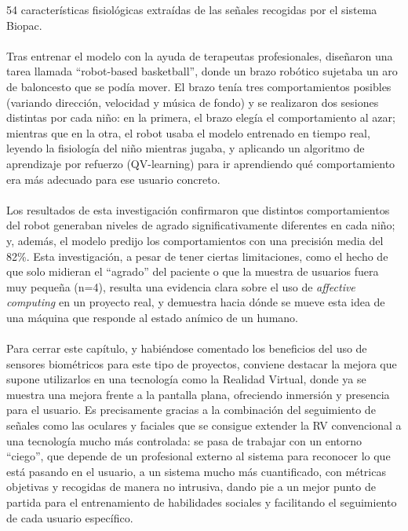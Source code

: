 \documentclass[12pt,twoside,titlepage]{report}
\begin{document}
54 características fisiológicas extraídas de las señales recogidas por el sistema Biopac.
\\\\
Tras entrenar el modelo con la ayuda de terapeutas profesionales, diseñaron una tarea llamada ``robot-based basketball'', donde un brazo robótico sujetaba un aro de baloncesto que se podía mover. El brazo tenía tres comportamientos posibles (variando dirección, velocidad y música de fondo) y se realizaron dos sesiones distintas por cada niño: en la primera, el brazo elegía el comportamiento al azar; mientras que en la otra, el robot usaba el modelo entrenado en tiempo real, leyendo la fisiología del niño mientras jugaba,
y aplicando un algoritmo de aprendizaje por refuerzo (QV-learning) para ir aprendiendo qué comportamiento era más adecuado para ese usuario concreto.
\\\\
Los resultados de esta investigación confirmaron que distintos comportamientos del robot generaban niveles de agrado significativamente diferentes en cada niño; y, además, el modelo predijo los comportamientos con una precisión media del 82\%. Esta investigación, a pesar de tener ciertas limitaciones, como el hecho de que solo midieran el ``agrado'' del paciente o que la muestra de usuarios fuera muy pequeña (n=4), resulta una evidencia clara sobre el uso de \textit{affective computing} en un proyecto real,
y demuestra hacia dónde se mueve esta idea de una máquina que responde al estado anímico de un humano.
\\\\
Para cerrar este capítulo, y habiéndose comentado los beneficios del uso de sensores biométricos para este tipo de proyectos, conviene destacar la mejora que supone utilizarlos en una tecnología como la Realidad Virtual, donde ya se muestra una mejora frente a la pantalla plana, ofreciendo inmersión y presencia para el usuario.
Es precisamente gracias a la combinación del seguimiento de señales como las oculares y faciales que se consigue extender la RV convencional a una tecnología mucho más controlada:
se pasa de trabajar con un entorno ``ciego'', que depende de un profesional externo al sistema para reconocer lo que está pasando en el usuario, a un sistema mucho más cuantificado, con métricas objetivas y recogidas de manera no intrusiva,
dando pie a un mejor punto de partida para el entrenamiento de habilidades sociales y facilitando el seguimiento de cada usuario específico.

\end{document}
